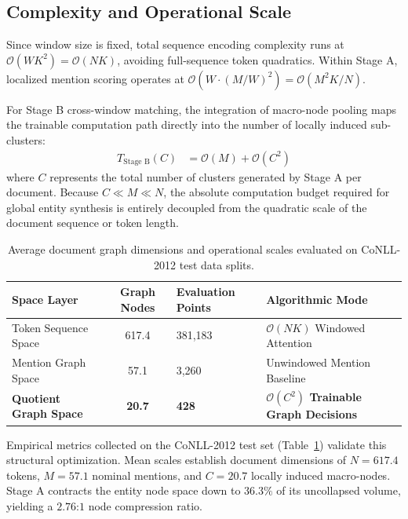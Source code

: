 \documentclass[12pt]{article}
\begin{document}
	\subsection{Complexity and Operational Scale}
	Since window size is fixed, total sequence encoding complexity runs at $\mathcal{O}(WK^2) = \mathcal{O}(NK)$, avoiding full-sequence token quadratics. Within Stage A, localized mention scoring operates at $\mathcal{O}(W \cdot (M/W)^2) = \mathcal{O}(M^2K/N)$.
	
	For Stage B cross-window matching, the integration of macro-node pooling maps the trainable computation path directly into the number of locally induced sub-clusters:
	\begin{align*}
		T_{\text{Stage B}}(C) &= \mathcal{O}(M) + \mathcal{O}(C^2)
	\end{align*}
	where $C$ represents the total number of clusters generated by Stage A per document. Because $C \ll M \ll N$, the absolute computation budget required for global entity synthesis is entirely decoupled from the quadratic scale of the document sequence or token length.
	
	\begin{table}[ht]
		\centering
		\small
		\begin{tabularx}{\textwidth}{lclX}
			\toprule
			\textbf{Space Layer} & \textbf{Graph Nodes} & \textbf{Evaluation Points} & \textbf{Algorithmic Mode} \\
			\midrule
			Token Sequence Space  & 617.4 & 381,183 & $\mathcal{O}(NK)$ Windowed Attention \\
			Mention Graph Space   & 57.1  & 3,260   & Unwindowed Mention Baseline \\
			\textbf{Quotient Graph Space} & \textbf{20.7}  & \textbf{428}     & \textbf{$\mathcal{O}(C^2)$ Trainable Graph Decisions} \\
			\bottomrule
		\end{tabularx}
		\caption{Average document graph dimensions and operational scales evaluated on CoNLL-2012 test data splits.}
		\label{tab:graph_scales}
	\end{table}
	
	Empirical metrics collected on the CoNLL-2012 test set (Table~\ref{tab:graph_scales}) validate this structural optimization. Mean scales establish document dimensions of $N = 617.4$ tokens, $M = 57.1$ nominal mentions, and $C = 20.7$ locally induced macro-nodes. Stage A contracts the entity node space down to $36.3\%$ of its uncollapsed volume, yielding a $2.76\text{:}1$ node compression ratio.
	
\end{document}

